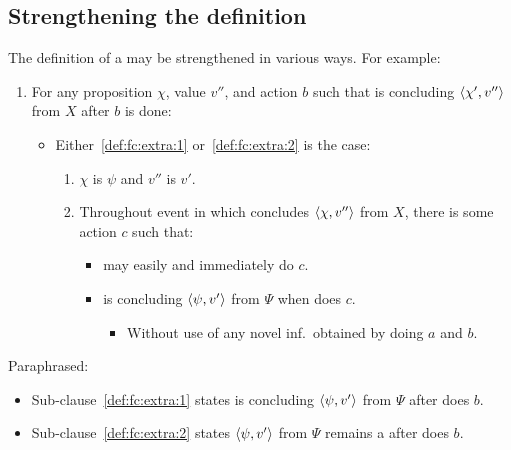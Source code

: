 \subsection{Strengthening the definition}

\begin{note}
  The definition of a \fc{} may be strengthened in various ways.
  For example:

  \begin{enumerate}[label=\alph*., ref=(\alph*), resume*=fcCounter]
  \item
    \label{def:fc:alt:c}
    For any proposition \(\chi\), value \(v''\), and action \(b\) such that \vAgent{} is concluding \(\langle \chi', v'' \rangle\) from \(X\) after \(b\) is done:
    \begin{itemize}
    \item
      Either~\ref{def:fc:extra:1} or~\ref{def:fc:extra:2} is the case:
      \begin{enumerate}[label=\arabic*., ref=\arabic*]
      \item
        \label{def:fc:extra:1}
        \(\chi\) is \(\psi\) and \(v''\) is \(v'\).
      \item
        \label{def:fc:extra:2}
        Throughout event in which \vAgent{} concludes \(\langle \chi, v'' \rangle\) from \(X\), there is some action \(c\) such that:
        \begin{itemize}
        \item
          \vAgent{} may easily and immediately do \(c\).
        \item
          \vAgent{} is concluding \(\langle \psi, v' \rangle\) from \(\Psi\) when \vAgent{} does \(c\).
          \begin{itemize}
          \item
            Without use of any novel inf.\ obtained by doing \(a\) and \(b\).
          \end{itemize}
        \end{itemize}
      \end{enumerate}
    \end{itemize}
  \end{enumerate}

  \noindent Paraphrased:

  \begin{itemize}[noitemsep]
  \item
    Sub-clause~\ref{def:fc:extra:1} states \vAgent{} is concluding \(\langle \psi, v' \rangle\) from \(\Psi\) after \vAgent{} does \(b\).
  \item
    Sub-clause~\ref{def:fc:extra:2} states \vAgent{} \(\langle \psi, v' \rangle\) from \(\Psi\) remains a \fc{} after \vAgent{} does \(b\).
  \end{itemize}


\end{note}
